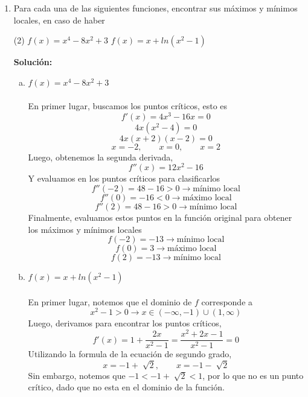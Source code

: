 \documentclass[12pt]{article}
\newenvironment{solucion}
{\begin{mdframed}[backgroundcolor=black!10]
		{\bf Solución:}\\
	}
	{
	\end{mdframed}
}
\newenvironment{preguntas}
{\begin{enumerate}\itemsep12pt
	}
	{
	\end{enumerate}
}
\newcommand{\ra}{\rightarrow}
\begin{document}
\begin{preguntas}
\item Para cada una de las siguientes funciones, encontrar sus máximos y mínimos locales, en caso de haber
\begin{tasks}(2)
\task $f(x) = x^4 - 8x^2 + 3$
\task $f(x)=x+ln(x^2-1)$
\end{tasks}
\begin{solucion}

\begin{enumerate}[a)]
\item $f(x) = x^4 - 8x^2 + 3$\\
\\
En primer lugar, buscamos los puntos críticos, esto es
$$f'(x) = 4x^3 - 16x = 0$$
$$4x(x^2 - 4) = 0$$
$$4x(x+2)(x-2) = 0$$
$$x = -2, \qquad x = 0, \qquad x = 2$$
Luego, obtenemos la segunda derivada,
$$f''(x) = 12x^2 - 16$$
Y evaluamos en los puntos críticos para clasificarlos
$$f''(-2) = 48 - 16 > 0 \ra \text{mínimo local}$$
$$f''(0) = -16 < 0 \ra \text{máximo local}$$
$$f''(2) = 48 - 16 > 0 \ra \text{mínimo local}$$
Finalmente, evaluamos estos puntos en la función original para obtener los máximos y mínimos locales
$$f(-2) = -13 \ra \text{mínimo local}$$
$$f(0) = 3 \ra \text{máximo local}$$
$$f(2) = -13 \ra \text{mínimo local}$$
\item $f(x)=x+ln(x^2-1)$\\
\\
En primer lugar, notemos que el dominio de $f$ corresponde a 
$$x^2-1 > 0 \ra x \in (-\infty, -1) \cup (1, \infty)$$
Luego, derivamos para encontrar los puntos críticos,
$$f'(x) = 1 + \dfrac{2x}{x^2-1} = \dfrac{x^2 +2x -1}{x^2-1} = 0$$
Utilizando la formula de la ecuación de segundo grado,
$$x = -1 + \sqrt[]{2}, \qquad x = -1 - \sqrt[]{2}$$
Sin embargo, notemos que $-1 < -1 + \sqrt[]{2} < 1$, por lo que no es un punto crítico, dado que no esta en el dominio de la función.


\end{enumerate}
\end{solucion}
\end{preguntas}
\end{document}
